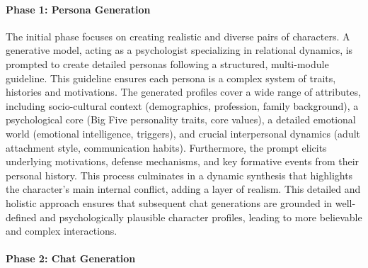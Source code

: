 \documentclass[twocolumn]{ceurart}
\begin{document}
\paragraph{Phase 1: Persona Generation}

The initial phase focuses on creating realistic and diverse pairs of characters. A generative model, acting as a psychologist specializing in relational dynamics, is prompted to create detailed personas following a structured, multi-module guideline. This guideline ensures each persona is a complex system of traits, histories and motivations. The generated profiles cover a wide range of attributes, including socio-cultural context (demographics, profession, family background), a psychological core (Big Five personality traits, core values), a detailed emotional world (emotional intelligence, triggers), and crucial interpersonal dynamics (adult attachment style, communication habits). Furthermore, the prompt elicits underlying motivations, defense mechanisms, and key formative events from their personal history. This process culminates in a dynamic synthesis that highlights the character's main internal conflict, adding a layer of realism. This detailed and holistic approach ensures that subsequent chat generations are grounded in well-defined and psychologically plausible character profiles, leading to more believable and complex interactions.

\paragraph{Phase 2: Chat Generation}
\end{document}
